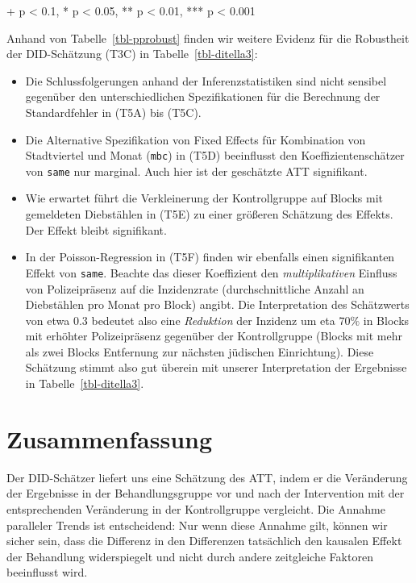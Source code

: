 \documentclass[
  a4paper,
  DIV=11,
  oneside]{scrreprt}
\begin{document}
\begin{minipage}{\linewidth}
+ p < 0.1, * p < 0.05, ** p < 0.01, *** p < 0.001\\
\end{minipage}
\endgroup

Anhand von Tabelle~\ref{tbl-pprobust} finden wir weitere Evidenz für die
Robustheit der DID-Schätzung (T3C) in Tabelle~\ref{tbl-ditella3}:

\begin{itemize}
\item
  Die Schlussfolgerungen anhand der Inferenzstatistiken sind nicht
  sensibel gegenüber den unterschiedlichen Spezifikationen für die
  Berechnung der Standardfehler in (T5A) bis (T5C).
\item
  Die Alternative Spezifikation von Fixed Effects für Kombination von
  Stadtviertel und Monat (\texttt{mbc}) in (T5D) beeinflusst den
  Koeffizientenschätzer von \texttt{same} nur marginal. Auch hier ist
  der geschätzte ATT signifikant.
\item
  Wie erwartet führt die Verkleinerung der Kontrollgruppe auf Blocks mit
  gemeldeten Diebstählen in (T5E) zu einer größeren Schätzung des
  Effekts. Der Effekt bleibt signifikant.
\item
  In der Poisson-Regression in (T5F) finden wir ebenfalls einen
  signifikanten Effekt von \texttt{same}. Beachte das dieser Koeffizient
  den \emph{multiplikativen} Einfluss von Polizeipräsenz auf die
  Inzidenzrate (durchschnittliche Anzahl an Diebstählen pro Monat pro
  Block) angibt. Die Interpretation des Schätzwerts von etwa \(0.3\)
  bedeutet also eine \emph{Reduktion} der Inzidenz um eta \(70\%\) in
  Blocks mit erhöhter Polizeipräsenz gegenüber der Kontrollgruppe
  (Blocks mit mehr als zwei Blocks Entfernung zur nächsten jüdischen
  Einrichtung). Diese Schätzung stimmt also gut überein mit unserer
  Interpretation der Ergebnisse in Tabelle~\ref{tbl-ditella3}.
\end{itemize}

\section{Zusammenfassung}\label{zusammenfassung}

Der DID-Schätzer liefert uns eine Schätzung des ATT, indem er die
Veränderung der Ergebnisse in der Behandlungsgruppe vor und nach der
Intervention mit der entsprechenden Veränderung in der Kontrollgruppe
vergleicht. Die Annahme paralleler Trends ist entscheidend: Nur wenn
diese Annahme gilt, können wir sicher sein, dass die Differenz in den
Differenzen tatsächlich den kausalen Effekt der Behandlung widerspiegelt
und nicht durch andere zeitgleiche Faktoren beeinflusst wird.
\end{document}
